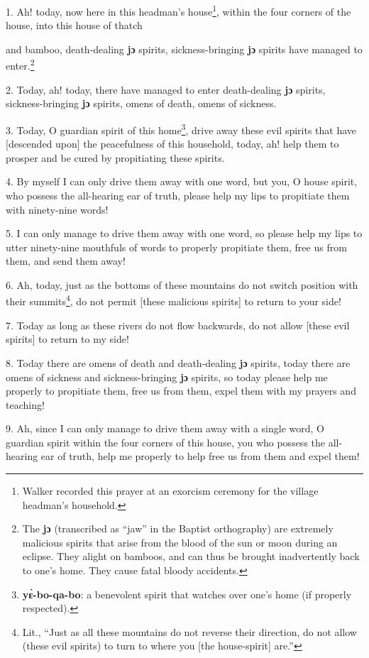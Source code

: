 \setcounter{footnote}{0}

1. Ah! today, now here in this headman's house\footnote{Walker recorded this prayer at an exorcism ceremony for the village headman's household.}, within the four corners of the
house, into this house of thatch

and bamboo, death-dealing\textbf{ jɔ }spirits, sickness-bringing\textbf{ jɔ}
spirits have managed to enter.\footnote{The \textbf{jɔ} (transcribed as ``jaw'' in the Baptist orthography) are extremely malicious spirits that arise from the blood of the sun or moon during an eclipse. They alight on bamboos, and can thus be brought inadvertently back to one's home. They cause fatal bloody accidents.}

2. Today, ah! today, there have managed to enter death-dealing \textbf{jɔ} spirits,
sickness-bringing\textbf{ jɔ} spirits, omens of death, omens of sickness.

3. Today, O guardian spirit of this home\footnote{\textbf{yɛ̀-bo-qa-bo}: a benevolent spirit that watches over one's home (if properly respected).}, drive away these evil spirits that
have [descended upon] the peacefulness of this household, today, ah! help them
to prosper and be cured by propitiating these spirits.

4. By myself I can only drive them away with one word, but you, O house spirit,
who possess the all-hearing ear of truth, please help my lips to propitiate them
with ninety-nine words!

5. I can only manage to drive them away with one word, so please help my lips to
utter ninety-nine mouthfuls of words to properly propitiate them, free us from
them, and send them away!

6. Ah, today, just as the bottoms of these mountains do not switch position with
their summits\footnote{Lit., ``Just as all these mountains do not reverse their direction, do not allow (these evil spirits) to turn to where you [the house-spirit] are.''}, do not permit [these malicious spirits] to return to your side!

7. Today as long as these rivers do not flow backwards, do not allow [these evil
spirits] to return to my side!

8. Today there are omens of death and death-dealing\textbf{ jɔ }spirits, today
there are omens of sickness and sickness-bringing\textbf{ jɔ }spirits, so today
please help me properly to propitiate them, free us from them, expel them with
my prayers and teaching!

9. Ah, since I can only manage to drive them away with a single word, O guardian
spirit within the four corners of this house, you who possess the all-hearing ear
of truth, help me properly to help free us from them and expel them!


